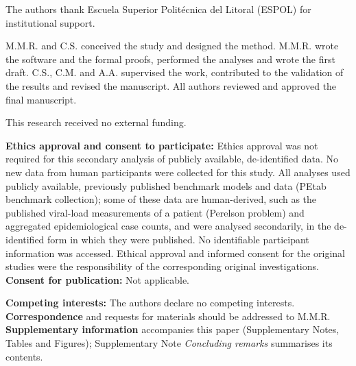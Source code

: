 \documentclass[pdflatex,sn-nature]{sn-jnl}
\theoremstyle{plain}
\begin{document}
The authors thank Escuela Superior Polit\'ecnica del Litoral (ESPOL) for institutional support.

M.M.R. and C.S. conceived the study and designed the method. M.M.R. wrote the software and the formal proofs, performed the analyses and wrote the first draft. C.S., C.M. and A.A. supervised the work, contributed to the validation of the results and revised the manuscript. All authors reviewed and approved the final manuscript.

This research received no external funding.

\textbf{Ethics approval and consent to participate:} Ethics approval was not required for this secondary analysis of publicly available, de-identified data. No new data from human participants were collected for this study. All analyses used publicly available, previously published benchmark models and data (PEtab benchmark collection); some of these data are human-derived, such as the published viral-load measurements of a patient (Perelson problem) and aggregated epidemiological case counts, and were analysed secondarily, in the de-identified form in which they were published. No identifiable participant information was accessed. Ethical approval and informed consent for the original studies were the responsibility of the corresponding original investigations.\\
\textbf{Consent for publication:} Not applicable.

\textbf{Competing interests:} The authors declare no competing interests.\\
\textbf{Correspondence} and requests for materials should be addressed to M.M.R.\\
\textbf{Supplementary information} accompanies this paper (Supplementary Notes, Tables and Figures); Supplementary Note \textit{Concluding remarks} summarises its contents.


\end{document}

